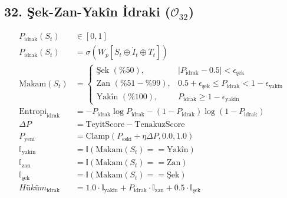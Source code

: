 \documentclass[11pt, a4paper]{article}
\begin{document}
\subsection{32. Şek-Zan-Yakîn İdraki ($\mathcal{O}_{32}$)}
\begin{align}
P_{\text{idrak}}(S_t) &\in [0, 1] \\
P_{\text{idrak}}(S_t) &= \sigma\left( W_p [S_t \oplus \dot{I}_t \oplus T_t] \right) \\
\text{Makam}(S_t) &= 
\begin{cases}
\text{Şek } (\%50), & |P_{\text{idrak}} - 0.5| < \epsilon_{\text{şek}} \\
\text{Zan } (\%51-\%99), & 0.5 + \epsilon_{\text{şek}} \le P_{\text{idrak}} < 1 - \epsilon_{\text{yakîn}} \\
\text{Yakîn } (\%100), & P_{\text{idrak}} \ge 1 - \epsilon_{\text{yakîn}}
\end{cases} \\
\text{Entropi}_{\text{idrak}} &= -P_{\text{idrak}} \log P_{\text{idrak}} - (1-P_{\text{idrak}}) \log (1-P_{\text{idrak}}) \\
\Delta P &= \text{TeyitScore} - \text{TenakuzScore} \\
P_{\text{yeni}} &= \text{Clamp}(P_{\text{eski}} + \eta \Delta P, 0.0, 1.0) \\
\mathbb{I}_{\text{yakîn}} &= \mathbb{I}(\text{Makam}(S_t) == \text{Yakîn}) \\
\mathbb{I}_{\text{zan}} &= \mathbb{I}(\text{Makam}(S_t) == \text{Zan}) \\
\mathbb{I}_{\text{şek}} &= \mathbb{I}(\text{Makam}(S_t) == \text{Şek}) \\
Hüküm_{\text{idrak}} &= 1.0 \cdot \mathbb{I}_{\text{yakîn}} + P_{\text{idrak}} \cdot \mathbb{I}_{\text{zan}} + 0.5 \cdot \mathbb{I}_{\text{şek}}
\end{align}
\end{document}
